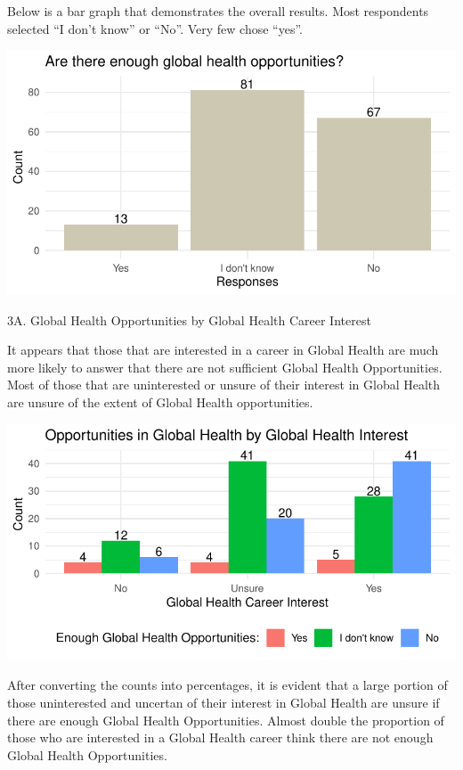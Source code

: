 \documentclass[
  letterpaper,
  DIV=11,
  numbers=noendperiod]{scrartcl}
\begin{document}
Below is a bar graph that demonstrates the overall results. Most
respondents selected ``I don't know'' or ``No''. Very few chose ``yes''.

\includegraphics{GlobalHealthQuartoHC_files/figure-pdf/unnamed-chunk-29-1.pdf}

\newpage

3A. Global Health Opportunities by Global Health Career Interest

It appears that those that are interested in a career in Global Health
are much more likely to answer that there are not sufficient Global
Health Opportunities. Most of those that are uninterested or unsure of
their interest in Global Health are unsure of the extent of Global
Health opportunities.

\includegraphics{GlobalHealthQuartoHC_files/figure-pdf/unnamed-chunk-30-1.pdf}

After converting the counts into percentages, it is evident that a large
portion of those uninterested and uncertan of their interest in Global
Health are unsure if there are enough Global Health Opportunities.
Almost double the proportion of those who are interested in a Global
Health career think there are not enough Global Health Opportunities.
\end{document}
